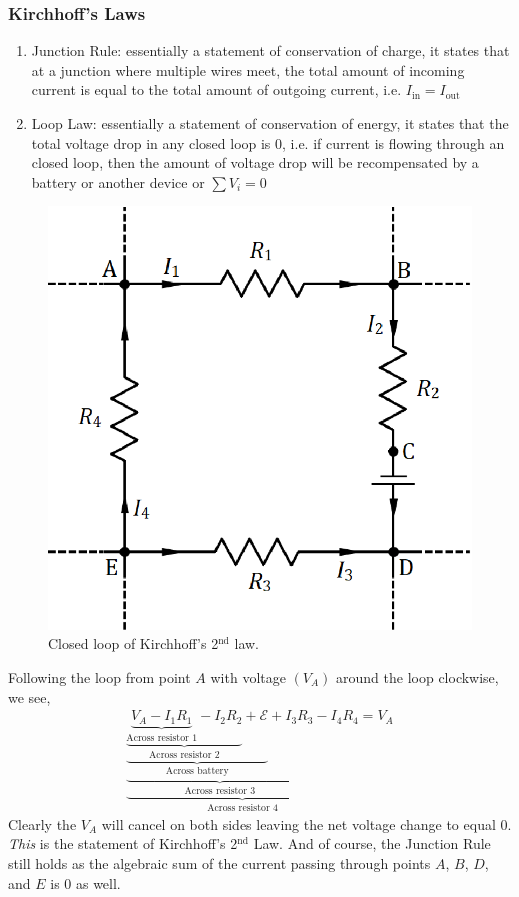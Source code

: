 \documentclass{scrartcl}
\begin{document}
    \subsubsection{Kirchhoff's Laws}
    \begin{enumerate}
        \item Junction Rule: essentially a statement of conservation of charge, it states that at a junction where multiple wires meet, the total amount of incoming current is equal to the total amount of outgoing current, i.e. $\boxed{I_\text{in}=I_\text{out}}$
        \item Loop Law: essentially a statement of conservation of energy, it states that the total voltage drop in any closed loop is 0, i.e. if current is flowing through an closed loop, then the amount of voltage drop will be recompensated by a battery or another device or $\boxed{\sum V_i=0}$
    \end{enumerate}
    \begin{figure}[H]
        \centering
        \includegraphics[scale=.75]{kirchhoff.eps}
        \caption{Closed loop of Kirchhoff's 2$^\text{nd}$ law.}
    \end{figure}
    \begin{itemize}
        Following the loop from point $A$ with voltage $\left(V_A\right)$ around the loop clockwise, we see,
        \begin{align*}
            \underbrace{\underbrace{\underbrace{\underbrace{\underbrace{V_A-I_1R_1}_{\text{Across resistor }1}-I_2R_2}_{\text{Across resistor }2}+\mathcal E}_{\text{Across battery}}+I_3R_3}_{\text{Across resistor }3}-I_4R_4}_{\text{Across resistor }4}=V_A
        \end{align*}
        Clearly the $V_A$ will cancel on both sides leaving the net voltage change to equal 0. \textit{This} is the statement of Kirchhoff's 2$^\text{nd}$ Law. And of course, the Junction Rule still holds as the algebraic sum of the current passing through points $A$, $B$, $D$, and $E$ is 0 as well.
    \end{itemize}
\end{document}
